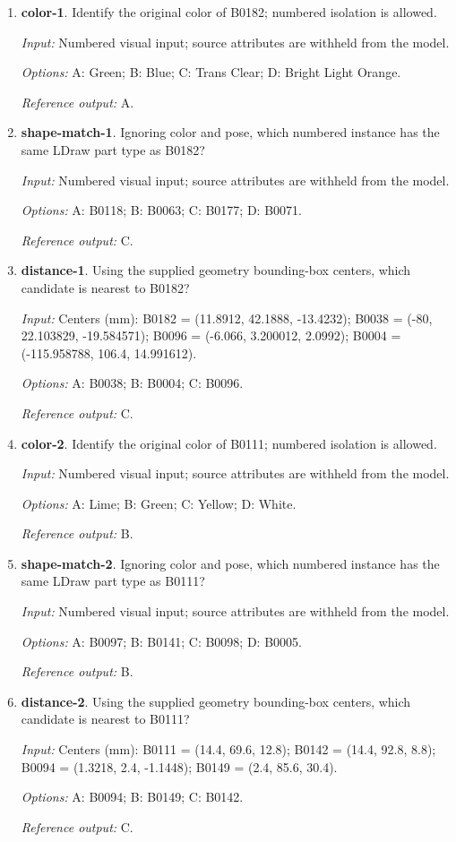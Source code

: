 \begin{enumerate}
\item \textbf{color-1}. Identify the original color of B0182; numbered isolation is allowed.\par {\small \textit{Input:} Numbered visual input; source attributes are withheld from the model. \par\textit{Options:} A: Green; B: Blue; C: Trans Clear; D: Bright Light Orange. \par\textit{Reference output:} A.}
\item \textbf{shape-match-1}. Ignoring color and pose, which numbered instance has the same LDraw part type as B0182?\par {\small \textit{Input:} Numbered visual input; source attributes are withheld from the model. \par\textit{Options:} A: B0118; B: B0063; C: B0177; D: B0071. \par\textit{Reference output:} C.}
\item \textbf{distance-1}. Using the supplied geometry bounding-box centers, which candidate is nearest to B0182?\par {\small \textit{Input:} Centers (mm): B0182 = (11.8912, 42.1888, -13.4232); B0038 = (-80, 22.103829, -19.584571); B0096 = (-6.066, 3.200012, 2.0992); B0004 = (-115.958788, 106.4, 14.991612). \par\textit{Options:} A: B0038; B: B0004; C: B0096. \par\textit{Reference output:} C.}
\item \textbf{color-2}. Identify the original color of B0111; numbered isolation is allowed.\par {\small \textit{Input:} Numbered visual input; source attributes are withheld from the model. \par\textit{Options:} A: Lime; B: Green; C: Yellow; D: White. \par\textit{Reference output:} B.}
\item \textbf{shape-match-2}. Ignoring color and pose, which numbered instance has the same LDraw part type as B0111?\par {\small \textit{Input:} Numbered visual input; source attributes are withheld from the model. \par\textit{Options:} A: B0097; B: B0141; C: B0098; D: B0005. \par\textit{Reference output:} B.}
\item \textbf{distance-2}. Using the supplied geometry bounding-box centers, which candidate is nearest to B0111?\par {\small \textit{Input:} Centers (mm): B0111 = (14.4, 69.6, 12.8); B0142 = (14.4, 92.8, 8.8); B0094 = (1.3218, 2.4, -1.1448); B0149 = (2.4, 85.6, 30.4). \par\textit{Options:} A: B0094; B: B0149; C: B0142. \par\textit{Reference output:} C.}

\end{enumerate}
